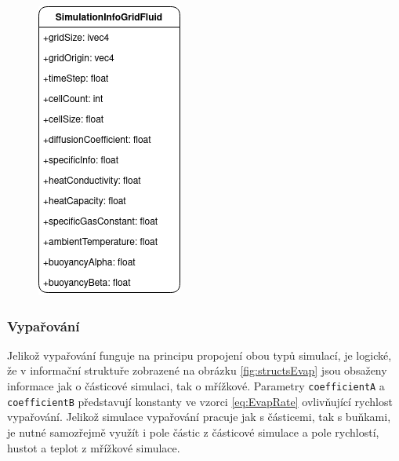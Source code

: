 \begin{figure}[hbt]
	\centering
	\captionsetup{justification=centering}
	\includegraphics[scale=0.6]{obrazky-figures/SimulationInfoGridFluid.png}
	\label{fig:structsGrid}
\end{figure}

\subsubsection{Vypařování}
Jelikož vypařování funguje na principu propojení obou typů simulací, je logické, že v informační struktuře zobrazené na obrázku \ref{fig:structsEvap} jsou obsaženy informace jak o částicové simulaci, tak o mřížkové. Parametry \texttt{coefficientA} a \texttt{coefficientB} představují konstanty ve vzorci \ref{eq:EvapRate} ovlivňující rychlost vypařování. Jelikož simulace vypařování pracuje jak s částicemi, tak s buňkami, je nutné samozřejmě využít i pole částic z částicové simulace a pole rychlostí, hustot a teplot z mřížkové simulace.


